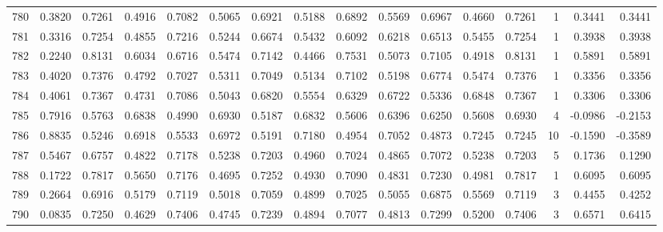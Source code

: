 \begin{tabular}{lrrrrrrrrrrrrrrr}
780 &      0.3820 &  0.7261 &  0.4916 &  0.7082 &  0.5065 &  0.6921 &  0.5188 &  0.6892 &  0.5569 &  0.6967 &   0.4660 &     0.7261 &      1 &                    0.3441 &                     0.3441 \\
781 &      0.3316 &  0.7254 &  0.4855 &  0.7216 &  0.5244 &  0.6674 &  0.5432 &  0.6092 &  0.6218 &  0.6513 &   0.5455 &     0.7254 &      1 &                    0.3938 &                     0.3938 \\
782 &      0.2240 &  0.8131 &  0.6034 &  0.6716 &  0.5474 &  0.7142 &  0.4466 &  0.7531 &  0.5073 &  0.7105 &   0.4918 &     0.8131 &      1 &                    0.5891 &                     0.5891 \\
783 &      0.4020 &  0.7376 &  0.4792 &  0.7027 &  0.5311 &  0.7049 &  0.5134 &  0.7102 &  0.5198 &  0.6774 &   0.5474 &     0.7376 &      1 &                    0.3356 &                     0.3356 \\
784 &      0.4061 &  0.7367 &  0.4731 &  0.7086 &  0.5043 &  0.6820 &  0.5554 &  0.6329 &  0.6722 &  0.5336 &   0.6848 &     0.7367 &      1 &                    0.3306 &                     0.3306 \\
785 &      0.7916 &  0.5763 &  0.6838 &  0.4990 &  0.6930 &  0.5187 &  0.6832 &  0.5606 &  0.6396 &  0.6250 &   0.5608 &     0.6930 &      4 &                   -0.0986 &                    -0.2153 \\
786 &      0.8835 &  0.5246 &  0.6918 &  0.5533 &  0.6972 &  0.5191 &  0.7180 &  0.4954 &  0.7052 &  0.4873 &   0.7245 &     0.7245 &     10 &                   -0.1590 &                    -0.3589 \\
787 &      0.5467 &  0.6757 &  0.4822 &  0.7178 &  0.5238 &  0.7203 &  0.4960 &  0.7024 &  0.4865 &  0.7072 &   0.5238 &     0.7203 &      5 &                    0.1736 &                     0.1290 \\
788 &      0.1722 &  0.7817 &  0.5650 &  0.7176 &  0.4695 &  0.7252 &  0.4930 &  0.7090 &  0.4831 &  0.7230 &   0.4981 &     0.7817 &      1 &                    0.6095 &                     0.6095 \\
789 &      0.2664 &  0.6916 &  0.5179 &  0.7119 &  0.5018 &  0.7059 &  0.4899 &  0.7025 &  0.5055 &  0.6875 &   0.5569 &     0.7119 &      3 &                    0.4455 &                     0.4252 \\
790 &      0.0835 &  0.7250 &  0.4629 &  0.7406 &  0.4745 &  0.7239 &  0.4894 &  0.7077 &  0.4813 &  0.7299 &   0.5200 &     0.7406 &      3 &                    0.6571 &                     0.6415 \\

\end{tabular}
